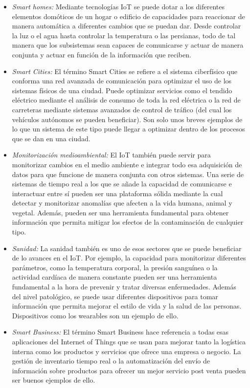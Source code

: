 \begin{itemize}
	\item \emph{Smart homes:} Mediante tecnologías IoT se puede dotar a los diferentes elementos domóticos de un hogar o edificio de capacidades para reaccionar de manera automática a diferentes cambios que se puedan dar. Desde controlar la luz o el agua hasta controlar la temperatura o las persianas, todo de tal manera que los subsistemas sean capaces de comunicarse y actuar de manera conjunta y actuar en función de la información que reciben.
	
	\item \emph{Smart Cities:} El término Smart Cities se refiere a el sistema ciberfísico que conforma una red avanzada de comunicación para optimizar el uso de los sistemas físicos de una ciudad. Puede optimizar servicios como el tendido eléctrico mediante el análisis de consumo de toda la red eléctrica o la red de carreteras mediante sistemas avanzados de control de tráfico (del cual los vehículos autónomos se pueden beneficiar). Son solo unos breves ejemplos de lo que un sistema de este tipo puede llegar a optimizar dentro de los procesos que se dan en una ciudad.
	
	\item \emph{Monitorización medioambiental:} El IoT también puede servir para monitorizar cambios en el medio ambiente e integrar todo esa adquisición de datos para que funcione de manera conjunta con otros sistemas. Una serie de sistemas de tiempo real a los que se añade la capacidad de comunicarse e interactuar entre sí pueden ser una plataforma sólida mediante la cual detectar y monitorizar anomalías que afecten a la vida humana, animal y vegetal. Además, pueden ser una herramienta fundamental para obtener información que permita mitigar los efectos de la contaminación de cualquier tipo.
	
	\item \emph{Sanidad:} La sanidad también es uno de esos sectores que se puede beneficiar de lo avances en el IoT. Por ejemplo, la capacidad para monitorizar diferentes parámetros, como la temperatura corporal, la presión sanguínea o la actividad cardíaca de manera constante pueden ser una herramienta fundamental a la hora de prevenir y tratar diversas enfermedades. Además del nivel patológico, se puede usar  diferentes dispositivos para tomar información que permita mejorar el estilo de vida y la salud de las personas. Dispositivos como los wearables son un ejemplo de ello. 
	
	\item \emph{Smart Business:} El término Smart Business hace referencia a todas esas aplicaciones del Internet of Things que se usan para mejorar tanto la logística interna como los productos y servicios que ofrece una empresa o negocio. La gestión de inventario tiempo real o la automatización del envío de información sobre productos para ofrecer un mejor servicio post venta pueden ser buenos ejemplos de ello.
	

\end{itemize}
